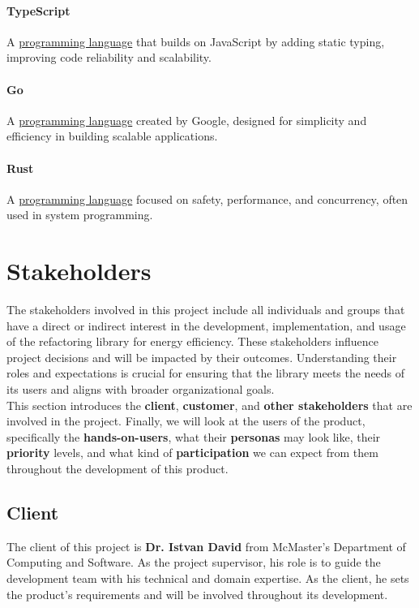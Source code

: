 \documentclass[12pt]{article}
\begin{document}
\paragraph*{TypeScript}
A \hyperref[term:progl]{programming language} that builds on
JavaScript by adding static typing, improving code reliability and scalability.

\paragraph*{Go}
A \hyperref[term:progl]{programming language} created by Google,
designed for simplicity and efficiency in building scalable applications.

\paragraph*{Rust}
A \hyperref[term:progl]{programming language} focused on safety,
performance, and concurrency, often used in system programming.

\section{Stakeholders}

The stakeholders involved in this project include all individuals and
groups that have a direct or indirect interest in the development,
implementation, and usage of the refactoring library for energy
efficiency. These stakeholders influence project decisions and will
be impacted by their outcomes. Understanding their roles and
expectations is crucial for ensuring that the library meets the needs
of its users and aligns with broader organizational goals.\\

This section introduces the \textbf{client}, \textbf{customer}, and
\textbf{other stakeholders} that are involved in the project.
Finally, we will look at the users of the product, specifically the
\textbf{hands-on-users}, what their \textbf{personas} may look like,
their \textbf{priority} levels, and what kind of
\textbf{participation} we can expect from them throughout the
development of this product.
\subsection{Client}
The client of this project is \textbf{Dr. Istvan David} from
McMaster's Department of Computing and Software. As the project
supervisor, his role is to guide the development team with his
technical and domain expertise. As the client, he sets the product's
requirements and will be involved throughout its development.
\end{document}

